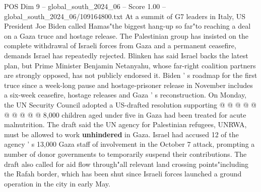 \begin{textsample}{POS Dim 9 – global\_south\_2024\_06 – Score 1.00 – global\_south\_2024\_06/109164800.txt}
At a summit of G7 leaders in Italy, US President Joe Biden called Hamas"the biggest hang-up so far"to reaching a deal on a Gaza truce and hostage release.
The Palestinian group has insisted on the complete withdrawal of Israeli forces from Gaza and a permanent ceasefire, demands Israel has repeatedly rejected.
Blinken has said Israel backs the latest plan, but Prime Minister Benjamin Netanyahu, whose far-right coalition partners are strongly opposed, has not publicly endorsed it.
Biden ' s roadmap for the first truce since a week-long pause and hostage-prisoner release in November includes a six-week ceasefire, hostage releases and Gaza ' s reconstruction.
On Monday, the UN Security Council adopted a US-drafted resolution supporting @ @ @ @ @ @ @ @ @ @ 8,000 children aged under five in Gaza had been treated for acute malnutrition.
The draft said the UN agency for Palestinian refugees, UNRWA, must be allowed to work \textbf{unhindered} in Gaza.
Israel had accused 12 of the agency ' s 13,000 Gaza staff of involvement in the October 7 attack, prompting a number of donor governments to temporarily suspend their contributions.
The draft also called for aid flow through"all relevant land crossing points"including the Rafah border, which has been shut since Israeli forces launched a ground operation in the city in early May.

\end{textsample}
